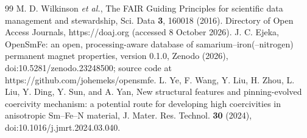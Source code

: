 \documentclass[10pt,twocolumn,letterpaper]{article}
\begin{document}
\begin{thebibliography}{99}
 M. D. Wilkinson \textit{et al.}, The FAIR Guiding Principles for scientific data management and stewardship, Sci. Data \textbf{3}, 160018 (2016).
 Directory of Open Access Journals, https://doaj.org (accessed 8 October 2026).
 J. C. Ejeka, OpenSmFe: an open, processing-aware database of samarium--iron(--nitrogen) permanent magnet properties, version 0.1.0, Zenodo (2026), doi:10.5281/zenodo.23248500; source code at https://github.com/johemeks/opensmfe.
 L. Ye, F. Wang, Y. Liu, H. Zhou, L. Liu, Y. Ding, Y. Sun, and A. Yan, New structural features and pinning-evolved coercivity mechanism: a potential route for developing high coercivities in anisotropic Sm--Fe--N material, J. Mater. Res. Technol. \textbf{30} (2024), doi:10.1016/j.jmrt.2024.03.040.
\end{thebibliography}
\end{document}
